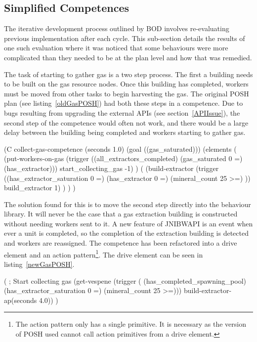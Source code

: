 \documentclass[11pt,openright,a4paper]{report}
\begin{document}
\subsection{Simplified Competences}
The iterative development process outlined by BOD involves re-evaluating previous implementation after each cycle. This sub-section details the results of one such evaluation where it was noticed that some behaviours were more complicated than they needed to be at the plan level and how that was remedied.

The task of starting to gather gas is a two step process. The first a building needs to be built on the gas resource nodes. Once this building has completed, workers must be moved from other tasks to begin harvesting the gas. The original POSH plan (see listing~\ref{oldGasPOSH}) had both these steps in a competence. Due to bugs resulting from upgrading the external APIs (see section~\ref{APIIssue}), the second step of the competence would often not work, and there would be a large delay between the building being completed and workers starting to gather gas.

\begin{Code}[frame=single,language=Lisp,tabsize=4,breaklines,breakatwhitespace,caption={The original POSH competence to manage collecting gas},label=oldGasPOSH]
	(C collect-gas-competence (seconds 1.0) (goal ((gas_saturated)))
		(elements
			(
				(put-workers-on-gas (trigger ((all_extractors_completed)
					(gas_saturated 0 =)
					(has_extractor))) start_collecting_gas -1)
			)
			(
				(build-extractor (trigger ((has_extractor_saturation 0 =)
					(has_extractor 0 =)
					(mineral_count 25 >=)
					)) build_extractor 1)
			)
		)
	)
\end{Code}

The solution found for this is to move the second step directly into the behaviour library. It will never be the case that a gas extraction building is constructed without needing workers sent to it. A new feature of JNIBWAPI is an event when ever a unit is completed, so the completion of the extraction building is detected and workers are reassigned. The competence has been refactored into a drive element and an action pattern\footnote{The action pattern only has a single primitive. It is necessary as the version of POSH used cannot call action primitives from a drive element.}. The drive element can be seen in listing~\ref{newGasPOSH}.

\begin{Code}[frame=single,language=Lisp,tabsize=4,breaklines,breakatwhitespace,caption={The current POSH drive to begin collecting gas},label=newGasPOSH]
(
	; Start collecting gas
	(get-vespene (trigger (	(has_completed_spawning_pool)
							(has_extractor_saturation 0 =)
							(mineral_count 25 >=)))
		build-extractor-ap(seconds 4.0))
)
\end{Code}
\end{document}
